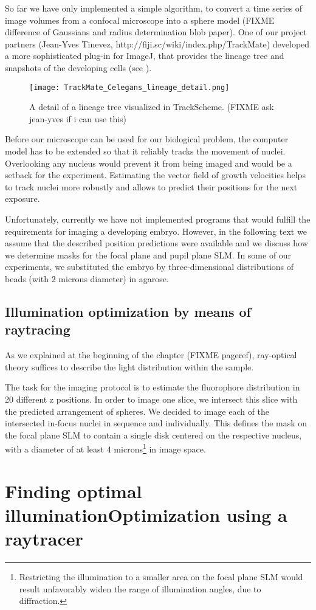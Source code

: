 So far we have only implemented a simple algorithm, to convert a time
series of image volumes from a confocal microscope into a sphere model
(FIXME difference of Gaussians and radius determination blob paper).
One of our project partners (Jean-Yves Tinevez,
http://fiji.sc/wiki/index.php/TrackMate) developed a more
sophisticated plug-in for ImageJ, that provides the lineage tree and
snapshots of the developing cells (see ).
\begin{figure}[!hbt]
  \centering
  \texttt{[image: TrackMate\_Celegans\_lineage\_detail.png]}
  \caption{ A detail of a lineage tree visualized in
    TrackScheme. (FIXME ask jean-yves if i can use this)}
  \label{fig:trackmate}
\end{figure}
Before our microscope can be used for our biological problem, the
computer model has to be extended so that it reliably tracks the
movement of nuclei.  Overlooking any nucleus would prevent it from being 
imaged and would be a setback for the experiment.  Estimating the
vector field of growth velocities helps to track nuclei more robustly
and allows to predict their positions for the next exposure.


Unfortunately, currently we have not implemented programs that would
fulfill the requirements for imaging a developing embryo.  However, in
the following text we assume that the described position predictions
were available and we discuss how we determine masks for the focal
plane and pupil plane SLM.  In some of our experiments, we substituted
the embryo by three-dimensional distributions of beads (with 2 microns
diameter) in agarose.

\subsection{Illumination optimization by means of raytracing}
As we explained at the beginning of the chapter (FIXME pageref),
ray-optical theory suffices to describe the light distribution within
the sample.

The task for the imaging protocol is to estimate the fluorophore
distribution in 20 different z positions. In order to image one slice,
we intersect this slice with the predicted arrangement of spheres. We
decided to image each of the intersected in-focus nuclei in sequence
and individually. This defines the mask on the focal plane SLM to
contain a single disk centered on the respective nucleus, with a
diameter of at least 4 microns\footnote{Restricting the illumination
  to a smaller area on the focal plane SLM would result unfavorably
  widen the range of illumination angles, due to diffraction.} in
image space.


\section{Finding optimal illuminationOptimization using a raytracer}
